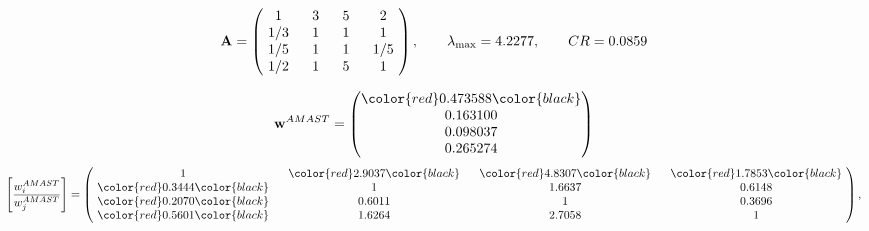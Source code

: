 \begin{example}
\begin{equation*}
\mathbf{A} =
\begin{pmatrix}
$\,\,$ 1 $\,\,$ & $\,\,$3$\,\,$ & $\,\,$5$\,\,$ & $\,\,$2 $\,\,$ \\
$\,\,$ 1/3$\,\,$ & $\,\,$ 1 $\,\,$ & $\,\,$1$\,\,$ & $\,\,$1 $\,\,$ \\
$\,\,$ 1/5$\,\,$ & $\,\,$ 1 $\,\,$ & $\,\,$ 1 $\,\,$ & $\,\,$ 1/5 $\,\,$ \\
$\,\,$ 1/2$\,\,$ & $\,\,$ 1 $\,\,$ & $\,\,$5$\,\,$ & $\,\,$ 1  $\,\,$ \\
\end{pmatrix},
\qquad
\lambda_{\max} =
4.2277,
\qquad
CR = 0.0859
\end{equation*}

\begin{equation*}
\mathbf{w}^{AMAST} =
\begin{pmatrix}
\color{red} 0.473588\color{black} \\
0.163100\\
0.098037\\
0.265274
\end{pmatrix}\end{equation*}
\begin{equation*}
\left[ \frac{{w}^{AMAST}_i}{{w}^{AMAST}_j} \right] =
\begin{pmatrix}
$\,\,$ 1 $\,\,$ & $\,\,$\color{red} 2.9037\color{black} $\,\,$ & $\,\,$\color{red} 4.8307\color{black} $\,\,$ & $\,\,$\color{red} 1.7853\color{black} $\,\,$ \\
$\,\,$\color{red} 0.3444\color{black} $\,\,$ & $\,\,$ 1 $\,\,$ & $\,\,$1.6637$\,\,$ & $\,\,$0.6148  $\,\,$ \\
$\,\,$\color{red} 0.2070\color{black} $\,\,$ & $\,\,$0.6011$\,\,$ & $\,\,$ 1 $\,\,$ & $\,\,$0.3696 $\,\,$ \\
$\,\,$\color{red} 0.5601\color{black} $\,\,$ & $\,\,$1.6264$\,\,$ & $\,\,$2.7058$\,\,$ & $\,\,$ 1  $\,\,$ \\
\end{pmatrix},
\end{equation*}


\end{example}
